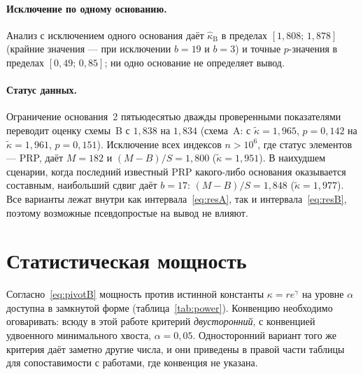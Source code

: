\documentclass[11pt,a4paper]{article}
\theoremstyle{plain}
\theoremstyle{remark}
\newcommand{\eg}{e^{\gamma}}
\begin{document}
\paragraph{Исключение по одному основанию.} Анализ с исключением одного основания даёт
$\hat\kappa_{\mathrm B}$ в пределах $[1{,}808;\,1{,}878]$ (крайние значения --- при
исключении $b=19$ и $b=3$) и точные $p$-значения в пределах $[0{,}49;\,0{,}85]$;
ни одно основание не определяет вывод.

\paragraph{Статус данных.} Ограничение основания~2 пятьюдесятью дважды проверенными
показателями переводит оценку схемы~B с $1{,}838$ на $1{,}834$ (схема~A: с
$\tilde\kappa=1{,}965$, $p=0{,}142$ на $\tilde\kappa=1{,}961$, $p=0{,}151$).
Исключение всех индексов $n>10^6$, где статус элементов --- PRP, даёт $M=182$ и
$(M-B)/S=1{,}800$ ($\tilde\kappa=1{,}951$). В наихудшем сценарии, когда последний
известный PRP какого-либо основания оказывается составным, наибольший сдвиг даёт
$b=17$: $(M-B)/S=1{,}848$ ($\tilde\kappa=1{,}977$). Все варианты лежат внутри как
интервала~\eqref{eq:resA}, так и интервала~\eqref{eq:resB}, поэтому возможные
псевдопростые на вывод не влияют.

\section{Статистическая мощность}\label{sec:power}

Согласно~\eqref{eq:pivotB} мощность против истинной константы $\kappa=r\eg$ на уровне
$\alpha$ доступна в замкнутой форме (таблица~\ref{tab:power}). Конвенцию необходимо
оговаривать: всюду в этой работе критерий \emph{двусторонний}, с конвенцией
удвоенного минимального хвоста, $\alpha=0{,}05$. Односторонний вариант того же
критерия даёт заметно другие числа, и они приведены в правой части таблицы для
сопоставимости с работами, где конвенция не указана.
\end{document}
